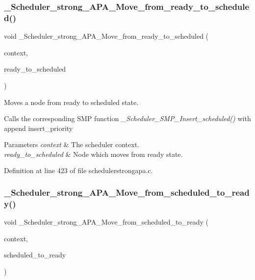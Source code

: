 \subsubsection{\texorpdfstring{\+\_\+\+Scheduler\+\_\+strong\+\_\+\+A\+P\+A\+\_\+\+Move\+\_\+from\+\_\+ready\+\_\+to\+\_\+scheduled()}{\_Scheduler\_strong\_APA\_Move\_from\_ready\_to\_scheduled()}}
{\footnotesize\ttfamily void \+\_\+\+Scheduler\+\_\+strong\+\_\+\+A\+P\+A\+\_\+\+Move\+\_\+from\+\_\+ready\+\_\+to\+\_\+scheduled (\begin{DoxyParamCaption}\item[{Scheduler\+\_\+\+Context $\ast$}]{context,  }\item[{Scheduler\+\_\+\+Node $\ast$}]{ready\+\_\+to\+\_\+scheduled }\end{DoxyParamCaption})}



Moves a node from ready to scheduled state. 

Calls the corresponding S\+MP function {\itshape \+\_\+\+Scheduler\+\_\+\+S\+M\+P\+\_\+\+Insert\+\_\+scheduled()} with append insert\+\_\+priority


\begin{DoxyParams}{Parameters}
{\em context} & The scheduler context. \\
\hline
{\em ready\+\_\+to\+\_\+scheduled} & Node which moves from ready state. \\
\hline
\end{DoxyParams}


Definition at line 423 of file schedulerstrongapa.\+c.

\mbox{\label{group__RTEMSScoreSchedulerStrongAPA_ga9589d6542faf83879288d437ca84c907}} 
\subsubsection{\texorpdfstring{\+\_\+\+Scheduler\+\_\+strong\+\_\+\+A\+P\+A\+\_\+\+Move\+\_\+from\+\_\+scheduled\+\_\+to\+\_\+ready()}{\_Scheduler\_strong\_APA\_Move\_from\_scheduled\_to\_ready()}}
{\footnotesize\ttfamily void \+\_\+\+Scheduler\+\_\+strong\+\_\+\+A\+P\+A\+\_\+\+Move\+\_\+from\+\_\+scheduled\+\_\+to\+\_\+ready (\begin{DoxyParamCaption}\item[{Scheduler\+\_\+\+Context $\ast$}]{context,  }\item[{Scheduler\+\_\+\+Node $\ast$}]{scheduled\+\_\+to\+\_\+ready }\end{DoxyParamCaption})}



